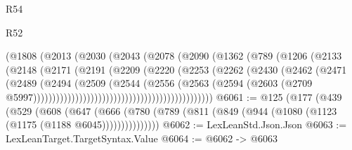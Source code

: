 \begin{lexlean}{R54}
\begin{lexlean}{R52}
\begin{coremodule}
{{{{{{{{{{{{{{{{{{{{{{{{{{{{{{{{{{{{{{{{{{{{{{{{{{{{{{{{{{{{{{{{{{{{{{{{{{{{{{{{{{{{{{{{{{{{{{{{{{{{{{{{{{{{{{{{{{{{{{{{{{{{{{{{{{{{{{{{{{{{{{{{{{{{{{{{{{{{{{{{{{{{{{{{{{{{{{{{{{{{{{{{{{{{{{{{{{{{{{                                        (@1808
                                          (@2013
                                            (@2030
                                              (@2043
                                                (@2078
                                                  (@2090
                                                    (@1362
                                                      (@789
                                                        (@1206
                                                          (@2133
                                                            (@2148
                                                              (@2171
                                                                (@2191
                                                                  (@2209
                                                                    (@2220
                                                                      (@2253
                                                                        (@2262
                                                                          (@2430
                                                                            (@2462
                                                                              (@2471
                                                                                (@2489
                                                                                  (@2494
                                                                                    (@2509
                                                                                      (@2544
                                                                                        (@2556
                                                                                          (@2563
                                                                                            (@2594
                                                                                              (@2603
                                                                                                (@2709
                                                                                                  @5997)))))))))))))))))))))))))))))))))))))))))))))))
@6061 := @125
    (@177
      (@439
        (@529
          (@608
            (@647
              (@666 (@780 (@789 (@811 (@849 (@944 (@1080 (@1123 (@1175 (@1188 @6045)))))))))))))))
@6062 := LexLeanStd.Json.Json
@6063 := LexLeanTarget.TargetSyntax.Value
@6064 := @6062 -> @6063
}}}}}}}}}}}}}}}}}}}}}}}}}}}}}}}}}}}}}}}}}}}}}}}}}}}}}}}}}}}}}}}}}}}}}}}}}}}}}}}}}}}}}}}}}}}}}}}}}}}}}}}}}}}}}}}}}}}}}}}}}}}}}}}}}}}}}}}}}}}}}}}}}}}}}}}}}}}}}}}}}}}}}}}}}}}}}}}}}}}}}}}}}}}}}}}}}}}}}}
\end{coremodule}
\end{lexlean}
\end{lexlean}
